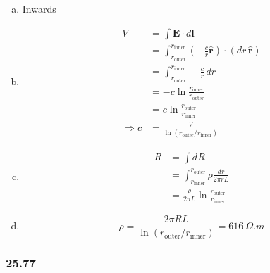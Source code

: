 \documentclass{article}
\begin{document}
\begin{enumerate}[(a)]
  \item Inwards

  \item

        \begin{align*}
          V             & = \int \mathbf{E} \cdot d\mathbf{l}                                                                                      \\
                        & = \int_{r_\textrm{outer}}^{r_\textrm{inner}} \left( -\frac{c}{r} \hat{\mathbf{r}} \right) \cdot (dr \, \hat{\mathbf{r}}) \\
                        & = \int_{r_\textrm{outer}}^{r_\textrm{inner}} -\frac{c}{r} \,dr                                                           \\
                        & = -c \ln \frac{r_\textrm{inner}}{r_\textrm{outer}}                                                                       \\
                        & = c \ln \frac{r_\textrm{outer}}{r_\textrm{inner}}                                                                        \\
          \Rightarrow c & = \frac{V}{\ln (r_\textrm{outer} / r_\textrm{inner})}
        \end{align*}

  \item

        \begin{align*}
          R & = \int dR                                                              \\
            & = \int_{r_\textrm{inner}}^{r_\textrm{outer}} \rho \frac{dr}{2 \pi r L} \\
            & = \frac{\rho}{2 \pi L} \ln \frac{r_\textrm{outer}}{r_\textrm{inner}}
        \end{align*}

  \item \[\rho = \frac{2 \pi R L}{\ln (r_\textrm{outer} / r_\textrm{inner})} = \qty{616}{\Omega.m}\]
\end{enumerate}

\subsubsection{25.77}
\end{document}

